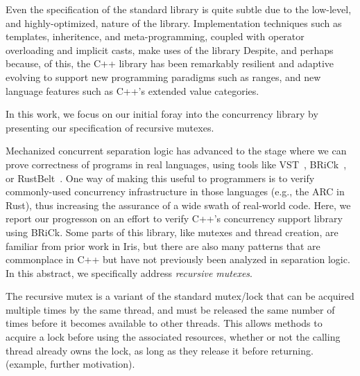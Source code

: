 \documentclass[sigplan,screen]{acmart}
\begin{document}
Even the specification of the standard library is quite subtle due to the low-level, and highly-optimized, nature of the library.
Implementation techniques such as templates, inheritence, and meta-programming, coupled with operator overloading and implicit casts, make uses of the library
Despite, and perhaps because, of this, the C++ library has been remarkably resilient and adaptive evolving to support new programming paradigms such as ranges, and new language features such as C++'s extended value categories.

In this work, we focus on our initial foray into the concurrency library by presenting our specification of recursive mutexes.



Mechanized concurrent separation logic has advanced to the stage where we can prove correctness of programs in real languages, using tools like VST~\cite{vst}, BRiCk~\cite{brick}, or RustBelt~\cite{rustbelt}. One way of making this useful to programmers is to verify commonly-used concurrency infrastructure in those languages (e.g., the ARC in Rust), thus increasing the assurance of a wide swath of real-world code. Here, we report our progresson on an effort to verify C++'s concurrency support library~\cite{} using BRiCk. Some parts of this library, like mutexes and thread creation, are familiar from prior work in Iris, but there are also many patterns that are commonplace in C++ but have not previously been analyzed in separation logic. In this abstract, we specifically address \emph{recursive mutexes}.

The recursive mutex is a variant of the standard mutex/lock that can be acquired multiple times by the same thread, and must be released the same number of times before it becomes available to other threads. This allows methods to acquire a lock before using the associated resources, whether or not the calling thread already owns the lock, as long as they release it before returning. (example, further motivation).
\end{document}
